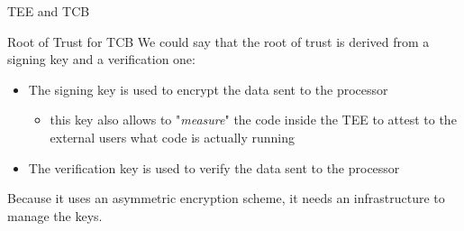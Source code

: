 \begin{section}{TEE and TCB}
\begin{subsection}{Root of Trust for TCB}
    We could say that the root of trust is derived from a signing key and a verification one:
    \begin{itemize}
      \item The signing key is used to encrypt the data sent to the processor
        \begin{itemize}
          \item this key also allows to "\textit{measure}" the code inside the TEE to attest to the
            external users what code is actually running
        \end{itemize}
      \item The verification key is used to verify the data sent to the processor
    \end{itemize}
    Because it uses an asymmetric encryption scheme, it needs an infrastructure to manage the keys.
  \end{subsection}
\end{section}
